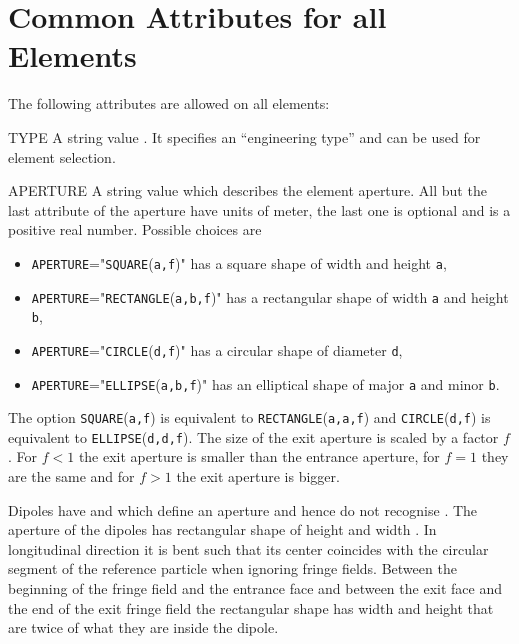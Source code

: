 \section{Common Attributes for all Elements}
\label{sec:Element:common}
The following attributes are allowed on all elements:
\begin{kdescription}
\item[TYPE]
  A {string value} .
  It specifies an ``engineering type'' and can be used for element
  selection.
\item[APERTURE]
  A {string value}  which describes
  the element aperture.
  All but the last attribute of the aperture have units of meter, the last one is optional and is a positive real number. Possible choices are
  \begin{itemize}
  \item \texttt{APERTURE}="\texttt{SQUARE}(\texttt{a,f})" has a square shape of width and height \texttt{a},
  \item \texttt{APERTURE}="\texttt{RECTANGLE}(\texttt{a,b,f})" has a rectangular shape of width \texttt{a} and height \texttt{b},
  \item \texttt{APERTURE}="\texttt{CIRCLE}(\texttt{d,f})" has a circular shape of diameter \texttt{d},
  \item \texttt{APERTURE}="\texttt{ELLIPSE}(\texttt{a,b,f})" has an elliptical shape of major \texttt{a} and minor \texttt{b}.
  \end{itemize}
  The option \texttt{SQUARE}(\texttt{a,f}) is equivalent to \texttt{RECTANGLE}(\texttt{a,a,f}) and \texttt{CIRCLE}(\texttt{d,f}) is equivalent to \texttt{ELLIPSE}(\texttt{d,d,f}). The size of the exit aperture is scaled by a factor $f$. For $f < 1$ the exit aperture is smaller than the entrance aperture, for $f = 1$ they are the same and for $f > 1$ the exit aperture is bigger.

  Dipoles have  and  which define an aperture and hence do not recognise . The aperture of the dipoles has rectangular shape of height  and width . In longitudinal direction it is bent such that its center coincides with the circular segment of the reference particle when ignoring fringe fields. Between the beginning of the fringe field and the entrance face and between the exit face and the end of the exit fringe field the rectangular shape has width and height that are twice of what they are inside the dipole.


\end{kdescription}
